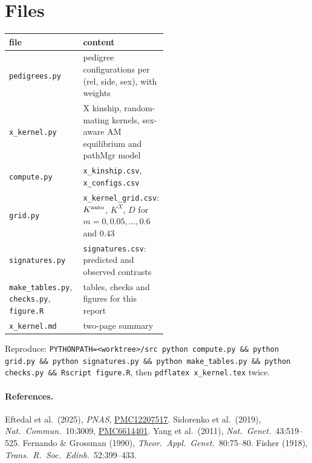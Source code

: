 \documentclass[11pt]{article}
\newcommand{\Kx}{K^{X}}
\newcommand{\Ka}{K^{\rm auto}}
\begin{document}
\section{Files}\label{sec:files}
\begin{center}\small
\begin{tabular}{lp{0.52\linewidth}}\toprule
file & content\\\midrule
\texttt{pedigrees.py} & pedigree configurations per (rel, side, sex), with weights\\
\texttt{x\_kernel.py} & X kinship, random-mating kernels, sex-aware AM equilibrium and pathMgr model\\
\texttt{compute.py} & \texttt{x\_kinship.csv}, \texttt{x\_configs.csv}\\
\texttt{grid.py} & \texttt{x\_kernel\_grid.csv}: $\Ka$, $\Kx$, $D$ for $m=0,0.05,\dots,0.6$ and $0.43$\\
\texttt{signatures.py} & \texttt{signatures.csv}: predicted and observed contrasts\\
\texttt{make\_tables.py}, \texttt{checks.py}, \texttt{figure.R} & tables, checks and figures for this report\\
\texttt{x\_kernel.md} & two-page summary\\\bottomrule
\end{tabular}
\end{center}
Reproduce: \texttt{PYTHONPATH=<worktree>/src python compute.py \&\& python grid.py \&\& python
signatures.py \&\& python make\_tables.py \&\& python checks.py \&\& Rscript figure.R}, then
\texttt{pdflatex x\_kernel.tex} twice.

\paragraph{References.}
Eftedal et al.\ (2025), \emph{PNAS}, \href{https://pmc.ncbi.nlm.nih.gov/articles/PMC12207517/}{PMC12207517}.
Sidorenko et al.\ (2019), \emph{Nat.\ Commun.}\ 10:3009,
\href{https://pmc.ncbi.nlm.nih.gov/articles/PMC6614401/}{PMC6614401}.
Yang et al.\ (2011), \emph{Nat.\ Genet.}\ 43:519--525. Fernando \& Grossman (1990), \emph{Theor.\ Appl.\
Genet.}\ 80:75--80. Fisher (1918), \emph{Trans.\ R.\ Soc.\ Edinb.}\ 52:399--433.
\end{document}
